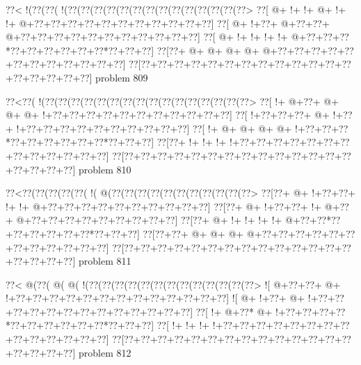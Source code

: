 \vbox{\vbox{\goo
\0??<\- !(\0??(\0??(\- !(\0??(\0??(\0??(\0??(\0??(\0??(\0??(\0??(\0??(\0??(\0??(\0??(\0??(\0??>
\0??[\- @+\- !+\- !+\- @+\- !+\- !+\- @+\0??+\0??+\0??+\0??+\0??+\0??+\0??+\0??+\0??+\0??+\0??]
\0??[\- @+\- !+\0??+\- @+\0??+\0??+\- @+\0??+\0??+\0??+\0??+\0??+\0??+\0??+\0??+\0??+\0??+\0??]
\0??[\- @+\- !+\- !+\- !+\- !+\- @+\0??+\0??+\0??*\0??+\0??+\0??+\0??+\0??+\0??*\0??+\0??+\0??]
\0??[\0??+\- @+\- @+\- @+\- @+\- @+\0??+\0??+\0??+\0??+\0??+\0??+\0??+\0??+\0??+\0??+\0??+\0??]
\0??[\0??+\0??+\0??+\0??+\0??+\0??+\0??+\0??+\0??+\0??+\0??+\0??+\0??+\0??+\0??+\0??+\0??+\0??]
}
\hfil problem 809\hfil\break
}



\vbox{\vbox{\goo
\0??<\0??(\- !(\0??(\0??(\0??(\0??(\0??(\0??(\0??(\0??(\0??(\0??(\0??(\0??(\0??(\0??(\0??(\0??>
\0??[\- !+\- @+\0??+\- @+\- @+\- @+\- !+\0??+\0??+\0??+\0??+\0??+\0??+\0??+\0??+\0??+\0??+\0??]
\0??[\- !+\0??+\0??+\0??+\- @+\- !+\0??+\- !+\0??+\0??+\0??+\0??+\0??+\0??+\0??+\0??+\0??+\0??]
\0??[\- !+\- @+\- @+\- @+\- @+\- !+\0??+\0??+\0??*\0??+\0??+\0??+\0??+\0??+\0??*\0??+\0??+\0??]
\0??[\0??+\- !+\- !+\- !+\- !+\0??+\0??+\0??+\0??+\0??+\0??+\0??+\0??+\0??+\0??+\0??+\0??+\0??]
\0??[\0??+\0??+\0??+\0??+\0??+\0??+\0??+\0??+\0??+\0??+\0??+\0??+\0??+\0??+\0??+\0??+\0??+\0??]
}
\hfil problem 810\hfil\break
}



\vbox{\vbox{\goo
\0??<\0??(\0??(\0??(\0??(\0??(\- !(\- @(\0??(\0??(\0??(\0??(\0??(\0??(\0??(\0??(\0??(\0??(\0??>
\0??[\0??+\- @+\- !+\0??+\0??+\- !+\- !+\- @+\0??+\0??+\0??+\0??+\0??+\0??+\0??+\0??+\0??+\0??]
\0??[\0??+\- @+\- !+\0??+\0??+\- !+\- @+\0??+\- @+\0??+\0??+\0??+\0??+\0??+\0??+\0??+\0??+\0??]
\0??[\0??+\- @+\- !+\- !+\- !+\- !+\- @+\0??+\0??*\0??+\0??+\0??+\0??+\0??+\0??*\0??+\0??+\0??]
\0??[\0??+\0??+\- @+\- @+\- @+\- @+\0??+\0??+\0??+\0??+\0??+\0??+\0??+\0??+\0??+\0??+\0??+\0??]
\0??[\0??+\0??+\0??+\0??+\0??+\0??+\0??+\0??+\0??+\0??+\0??+\0??+\0??+\0??+\0??+\0??+\0??+\0??]
}
\hfil problem 811\hfil\break
}



\vbox{\vbox{\goo
\0??<\- @(\0??(\- @(\- @(\- !(\0??(\0??(\0??(\0??(\0??(\0??(\0??(\0??(\0??(\0??(\0??(\0??(\0??>
\- ![\- @+\0??+\0??+\- @+\- !+\0??+\0??+\0??+\0??+\0??+\0??+\0??+\0??+\0??+\0??+\0??+\0??+\0??]
\- ![\- @+\- !+\0??+\- @+\- !+\0??+\0??+\0??+\0??+\0??+\0??+\0??+\0??+\0??+\0??+\0??+\0??+\0??]
\0??[\- !+\- @+\0??*\- @+\- !+\0??+\0??+\0??+\0??*\0??+\0??+\0??+\0??+\0??+\0??*\0??+\0??+\0??]
\0??[\- !+\- !+\- !+\- !+\0??+\0??+\0??+\0??+\0??+\0??+\0??+\0??+\0??+\0??+\0??+\0??+\0??+\0??]
\0??[\0??+\0??+\0??+\0??+\0??+\0??+\0??+\0??+\0??+\0??+\0??+\0??+\0??+\0??+\0??+\0??+\0??+\0??]
}
\hfil problem 812\hfil\break
}



